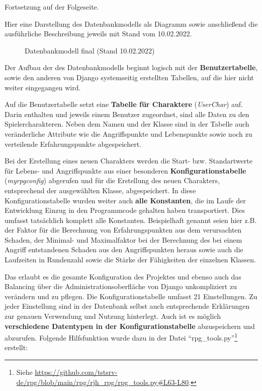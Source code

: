 Fortsetzung auf der Folgeseite. 

\newpage

Hier eine Darstellung des Datenbankmodells als Diagramm sowie anschließend die ausführliche Beschreibung jeweils mit Stand vom 10.02.2022. 

\begin{figure}[H]
    \centering
    \label{fig:henning-datenbankmodell-final}
    \caption{Datenbankmodell final (Stand 10.02.2022)}
\end{figure}


Der Aufbau der des Datenbankmodells beginnt logisch mit der \textbf{Benutzertabelle}, sowie den anderen von Django systemseitig erstellten Tabellen, auf die hier nicht weiter eingegangen wird.

Auf die Benutzertabelle setzt eine \textbf{Tabelle für Charaktere} (\textit{UserChar}) auf. Darin enthalten und jeweils einem Benutzer zugeordnet, sind alle Daten zu den Spielercharakteren. Neben dem Namen und der Klasse sind in der Tabelle auch veränderliche Attribute wie die Angriffspunkte und Lebenspunkte sowie noch zu verteilende Erfahrungspunkte abgespeichert. 

Bei der Erstellung eines neuen Charakters werden die Start- bzw. Standartwerte für Lebens- und Angriffspunkte aus einer besonderen \textbf{Konfigurationstabelle} (\textit{myrpgconfig}) abgerufen und für die Erstellung des neuen Charakters, entsprechend der ausgewählten Klasse, abgespeichert. In diese Konfigurationstabelle wurden weiter auch \textbf{alle Konstanten}, die im Laufe der Entwicklung Einzug in den Programmcode gehalten haben transportiert. Dies umfasst tatsächlich komplett alle Konstanten. Beispielhaft genannt seien hier z.B. der Faktor für die Berechnung von Erfahrungspunkten aus dem verursachten Schaden, der Minimal- und Maximalfaktor bei der Berechnung des bei einem Angriff entstandenen Schaden aus den Angriffspunkten heraus sowie auch die Laufzeiten in Rundenzahl sowie die Stärke der Fähigkeiten der einzelnen Klassen. 

Das erlaubt es die gesamte Konfiguration des Projektes und ebenso auch das Balancing über die Administrationsoberfläche von Django unkompliziert zu verändern und zu pflegen. Die Konfigurationstabelle umfasst 21 Einstellungen. Zu jeder Einstellung sind in der Datenbank selbst auch entsprechende Erklärungen zur genauen Verwendung und Nutzung hinterlegt. Auch ist es möglich \textbf{verschiedene Datentypen in der Konfigurationstabelle} abzuspeichern und abzurufen. Folgende Hilfsfunktion wurde dazu in der Datei \enquote{rpg\_tools.py}\footnote{Siehe \url{https://github.com/tstsrv-de/rpg/blob/main/rpg/rjh_rpg/rpg_tools.py\#L63-L80}.} erstellt: 

